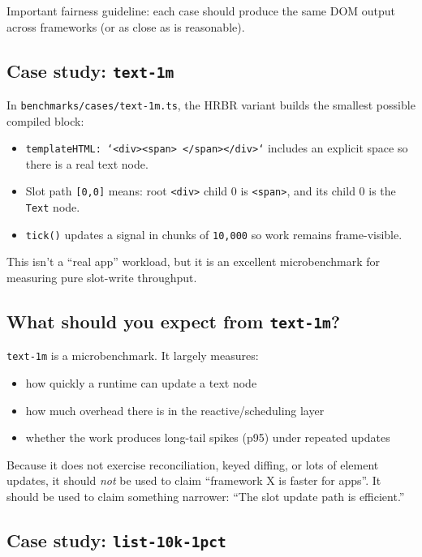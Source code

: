 Important fairness guideline: each case should produce the same DOM output across frameworks (or as close as is reasonable).

\subsection{Case study: \texttt{text-1m}}

In \texttt{benchmarks/cases/text-1m.ts}, the HRBR variant builds the smallest possible compiled block:

\begin{itemize}
\item \texttt{templateHTML: `<div><span> </span></div>`} includes an explicit space so there is a real text node.
\item Slot path \texttt{[0,0]} means: root \texttt{<div>} child 0 is \texttt{<span>}, and its child 0 is the \texttt{Text} node.
\item \texttt{tick()} updates a signal in chunks of \texttt{10,000} so work remains frame-visible.
\end{itemize}

This isn't a ``real app'' workload, but it is an excellent microbenchmark for measuring pure slot-write throughput.

\subsection{What should you expect from \texttt{text-1m}?}

	\texttt{text-1m} is a microbenchmark.
It largely measures:

\begin{itemize}
\item how quickly a runtime can update a text node
\item how much overhead there is in the reactive/scheduling layer
\item whether the work produces long-tail spikes (p95) under repeated updates
\end{itemize}

Because it does not exercise reconciliation, keyed diffing, or lots of element updates, it should \emph{not} be used to claim ``framework X is faster for apps''.
It should be used to claim something narrower: ``The slot update path is efficient.''

\subsection{Case study: \texttt{list-10k-1pct}}

